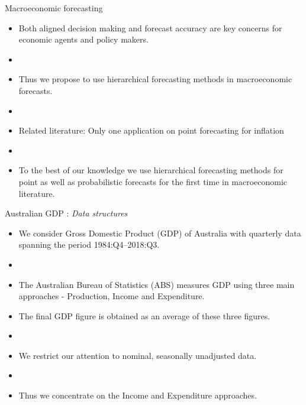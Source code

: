 \documentclass[11pt,xcolor=dvipsnames,table]{beamer} %
\begin{document}
\begin{frame}{Macroeconomic forecasting}
\begin{itemize}[<+-| alert@+>]
	\item Both aligned decision making and forecast accuracy are key concerns for economic agents and policy makers.
	\item[]
	\item Thus we propose to use hierarchical forecasting methods in macroeconomic forecasts.
	\item[]
	\item Related literature: Only one application on point forecasting for inflation \citep{capistran2010multi,weiss2018essays}
	\item[]
	\item To the best of our knowledge we use hierarchical forecasting methods for point as well as probabilistic forecasts for the first time in macroeconomic literature. 
\end{itemize}
\end{frame}



\begin{frame}{Australian GDP : \textit{Data structures}}
\begin{itemize}[<+-| alert@+>]
	\item We consider Gross Domestic Product (GDP) of Australia with quarterly data spanning the period 1984:Q4--2018:Q3.
	\item[]
	\item The Australian Bureau of Statistics (ABS) measures GDP using three main approaches - Production, Income and Expenditure.
	\item[] The final GDP figure is obtained as an average of these three figures.
	\item[]
	\item We restrict our attention to nominal, seasonally unadjusted data.
	\item[]
	\item Thus we concentrate on the Income and Expenditure approaches.  
\end{itemize}
\end{frame}


\end{document}
